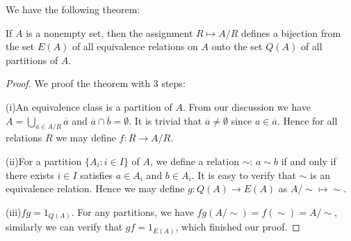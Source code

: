 We have the following theorem:
\begin{theorem}
If $A$ is a nonempty set, then the assignment $R\mapsto A/R$ defines a bijection from the set $E(A)$ of all equivalence relations on $A$ onto the set $Q(A)$ of all partitions of $A$.
\end{theorem}
\begin{proof}
We proof the theorem with 3 steps:\par
(i)An equivalence class is a partition of $A$. From our discussion we have $A=\bigcup_{\overline{a}\in A/R}\overline{a}$ and $\overline{a}\cap\overline{b}=\emptyset$. It is trivial that $\overline{a}\ne\emptyset$ since $a\in\overline{a}$. Hence for all relations $R$ we may define $f:R\to A/R$.\par
(ii)For a partition $\{A_i:i\in I\}$ of $A$, we define a relation $\sim$: $a\sim b$ if and only if there exists $i\in I$ satisfies $a\in A_i$ and $b\in A_i$. It is easy to verify that $\sim$ is an equivalence relation. Hence we may define $g:Q(A)\to E(A)$ as $A/\sim\mapsto\sim$.\par
(iii)$fg=1_{Q(A)}$. For any partitions, we have $fg(A/\sim)=f(\sim)=A/\sim$, similarly we can verify that $gf=1_{E(A)}$, which finished our proof.
\end{proof}